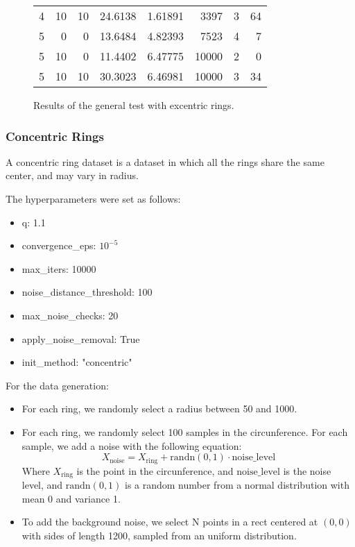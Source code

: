 \documentclass[conference]{IEEEtran}
\begin{document}
\begin{figure*}[!ht]
\begin{tabular}{rrrrrrrr}
                     4 &           10 &                 10 &     24.6138  &    1.61891     &      3397    &             3 &              64       \\
                     5 &            0 &                  0 &     13.6484  &    4.82393     &      7523    &             4 &               7       \\
                     5 &           10 &                  0 &     11.4402  &    6.47775     &     10000    &             2 &               0       \\
                     5 &           10 &                 10 &     30.3023  &    6.46981     &     10000    &             3 &              34       \\
    \hline
    \end{tabular}
\caption{Results of the general test with excentric rings.}
\end{figure*}

\subsubsection{Concentric Rings}
A concentric ring dataset is a dataset in which all the rings share the same center, and may vary in radius.

The hyperparameters were set as follows:

\begin{itemize}
    \item q: 1.1
    \item convergence\_eps: $10^{-5}$
    \item max\_iters: 10000
    \item noise\_distance\_threshold: 100
    \item max\_noise\_checks: 20
    \item apply\_noise\_removal: True
    \item init\_method: "concentric"
\end{itemize}

For the data generation:
\begin{itemize}
    \item For each ring, we randomly select a radius between 50 and 1000.
    \item For each ring, we randomly select 100 samples in the circunference. For each sample, we add a noise with the following equation:
    \begin{equation}
        X_{\text{noise}} = X_{\text{ring}} + \text{randn}(0, 1) \cdot \text{noise\_level}
    \end{equation}
    Where $X_{\text{ring}}$ is the point in the circunference, and $\text{noise\_level}$ is the noise level, and $\text{randn}(0, 1)$ is a random number from a normal distribution with mean 0 and variance 1.
    \item To add the background noise, we select N points in a rect centered at $(0, 0)$ with sides of length 1200, sampled from an uniform distribution.
\end{itemize}
\end{document}
